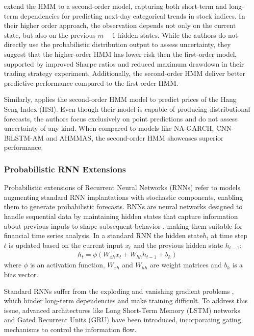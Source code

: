 \textcite{zhang2019high} extend the HMM to a second-order model, capturing both short-term and long-term dependencies for predicting next-day categorical trends in stock indices. In their higher order approach, the observation depends not only on the current state, but also on the previous $m-1$ hidden states. While the authors do not directly use the probabilistic distribution output to assess uncertainty, they suggest that the higher-order HMM has lower risk then the first-order model, supported by improved Sharpe ratios and reduced maximum drawdown in their trading strategy experiment. Additionally, the second-order HMM deliver better predictive performance compared to the first-order HMM.

Similarly, \textcite{su2022hmm} applies the second-order HMM model to predict prices of the Hang Seng Index (HSI). Even though their model is capable of producing distributional forecasts, the authors focus exclusively on point predictions and do not assess uncertainty of any kind. When compared to models like NA-GARCH, CNN-BiLSTM-AM and AHMMAS, the second-order HMM showcases superior performance. 




\subsubsection{Probabilistic RNN Extensions}
Probabilistic extensions of Recurrent Neural Networks (RNNs) refer to models augmenting standard RNN implantations with stochastic components, enabling them to generate probabilistic forecasts. RNNs are neural networks designed to handle sequential data by maintaining hidden states that capture information about previous inputs to shape subsequent behavior \parencite{Elman1990Finding}, making them suitable for financial time series analysis. In a standard RNN the hidden state$h_t$ at time step $t$ is updated based on the current input $x_t$ and the previous hidden state $h_{t-1}$:
\begin{equation}
    \begin{gathered}
        h_t = \phi(W_{xh}x_t + W_{hh}h_{t-1} + b_h)
    \end{gathered}
\end{equation}
where $\phi$ is an activation function, $W_{xh}$ and $W_{hh}$ are weight matrices and $b_h$ is a bias vector. 

Standard RNNs suffer from the exploding and vanishing gradient problems \parencite{Pascanu2013Difficulty}, which hinder long-term dependencies and make training difficult. To address this issue, advanced architectures like Long Short-Term Memory (LSTM) networks \parencite{Hochreiter1997LSTM} and Gated Recurrent Units (GRU) \parencite{Cho2014Learning} have been introduced, incorporating gating mechanisms to control the information flow. 

